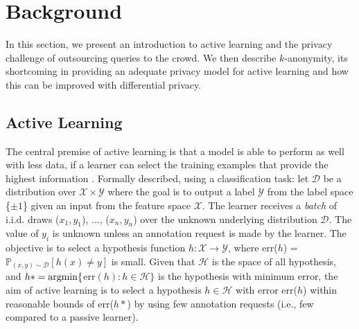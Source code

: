 \documentclass[letterpaper]{article}
\newcommand{\argmin}{\operatornamewithlimits{argmin}}
\begin{document}
\section{Background}
\label{background}

In this section, we present an introduction to active learning and the privacy challenge of outsourcing queries to the crowd. We then describe $k$-anonymity, its shortcoming in providing an adequate privacy model for active learning and how this can be improved with differential privacy.

\subsection{Active Learning}

The central premise of active learning is that a model is able to perform as well with less data, if a learner can select the training examples that provide the highest information \cite{settles1648active}. Formally described, using a classification task: let $\mathcal{D}$ be a distribution over $\mathcal{X} \times \mathcal{Y}$ where the goal is to output a label $\mathcal{Y}$ from the label space \{$\pm1$\} given an input from the feature space $\mathcal{X}$. The learner receives a \textit{batch} of i.i.d. draws ($x_1,y_1$), ..., ($x_n,y_n$) over the unknown underlying distribution $\mathcal{D}$. The value of $y_i$ is unknown unless an annotation request is made by the learner. The objective is to select a hypothesis function $h: \mathcal{X} \to \mathcal{Y}$, where err($h$) = $\mathbb{P}_{(x,y)\sim\mathcal{D}}[h(x) \neq y]$ is small. Given that $\mathcal{H}$ is the space of all hypothesis, and $h* = \argmin\{$err$(h) : h \in \mathcal{H}\}$ is the hypothesis with minimum error, the aim of active learning is to select a hypothesis $h \in \mathcal{H}$ with error err($h$) within reasonable bounds of err($h*$) by using few annotation requests (i.e., few compared to a passive learner).
\end{document}
